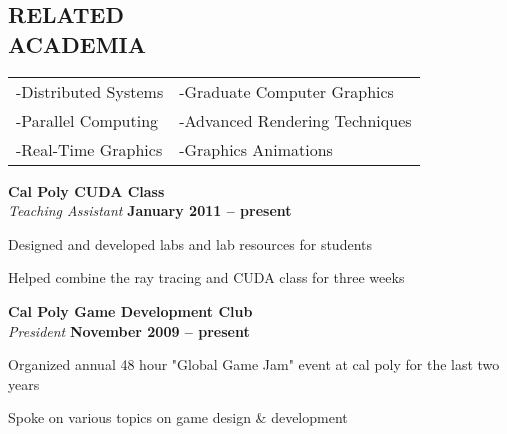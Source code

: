\documentclass[margin,line]{resume}
\begin{document}
\begin{resume}
\sectionline

    \section{\mysidestyle \textbf{\large{R}\small{ELATED\\ACADEMIA}}} 

  \vspace{1mm} %
  \begin{tabular}{@{}p{6cm}p{6cm}}
  -Distributed Systems     &  -Graduate Computer Graphics   \\
  -Parallel Computing      &  -Advanced Rendering Techniques\\
  -Real-Time Graphics      &  -Graphics Animations          \\
  \end{tabular}

  \textbf{\listing Cal Poly CUDA Class}\\\vspace{1mm}%
  \textsl{Teaching Assistant} \hfill \textbf{ January 2011 -- present}\vspace{-3mm}\\\vspace{-1mm}%
    \begin{list2}
      \item Designed and developed labs and lab resources for students
        \item Helped combine the ray tracing and CUDA class for three weeks
    \end{list2}\vspace{-1.5mm}

  \textbf{\listing Cal Poly Game Development Club}\\\vspace{1mm}%
  \textsl{President}\hfill \textbf{ November 2009 -- present}\vspace{-3mm}\\\vspace{-1mm}%
    \begin{list2}
      \item Organized annual 48 hour "Global Game Jam" event at cal poly for the last two years
        \item Spoke on various topics on game design \& development
    \end{list2}\vspace{-1.5mm}


\end{resume}
\end{document}

